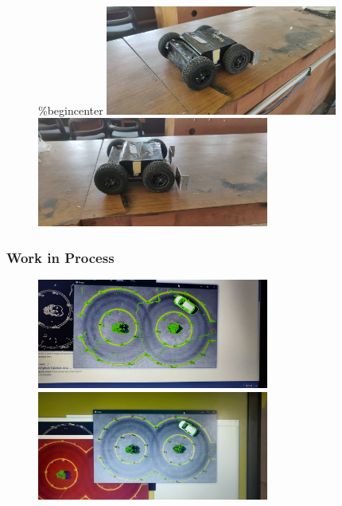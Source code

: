 \begin{figure}[!tbh] %
\%begin{center}
	\includegraphics[width = 3in]{images/botpid7.jpg}
	\hspace{.5cm}
	\includegraphics[width = 3in]{images/botpic8.jpg}
	\label{figSample1} %
\end{figure}



\subsubsection{Work in Process}
\begin{figure}[!tbh] %
	\includegraphics[width = 3in]{images/work in process1.jpg} 
	\hspace{.5cm}
	\includegraphics[width = 3in]{images/work in process2.jpg} 
	\label{figSample1} %
\end{figure}


